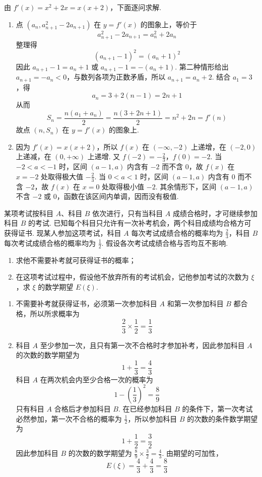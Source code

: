 \begin{solution}
由 \(f'(x)=x^2+2x=x(x+2)\)，下面逐问求解.
\begin{enumerate}
\item 点 \((a_n,a_{n+1}^2-2a_{n+1})\) 在 \(y=f'(x)\) 的图象上，等价于
\[
a_{n+1}^2-2a_{n+1}=a_n^2+2a_n
\]
整理得
\[
(a_{n+1}-1)^2=(a_n+1)^2
\]
因此 \(a_{n+1}-1=a_n+1\) 或 \(a_{n+1}-1=-(a_n+1)\). 第二种情形给出 \(a_{n+1}=-a_n<0\)，与数列各项为正数矛盾，所以 \(a_{n+1}=a_n+2\). 结合 \(a_1=3\)，得
\[
a_n=3+2(n-1)=2n+1
\]
从而
\[
S_n=\frac{n(a_1+a_n)}{2}=\frac{n(3+2n+1)}{2}=n^2+2n=f'(n)
\]
故点 \((n,S_n)\) 在 \(y=f'(x)\) 的图象上.

\item 因为 \(f'(x)=x(x+2)\)，所以 \(f(x)\) 在 \((-\infty,-2)\) 上递增，在 \((-2,0)\) 上递减，在 \((0,+\infty)\) 上递增. 又 \(f(-2)=-\frac{2}{3}\)，\(f(0)=-2\).
当 \(-2<a<-1\) 时，区间 \((a-1,a)\) 内含有 \(-2\) 而不含 \(0\)，故 \(f(x)\) 在 \(x=-2\) 处取得极大值 \(-\frac{2}{3}\). 当 \(0<a<1\) 时，区间 \((a-1,a)\) 内含有 \(0\) 而不含 \(-2\)，故 \(f(x)\) 在 \(x=0\) 处取得极小值 \(-2\). 其余情形下，区间 \((a-1,a)\) 不含 \(-2\) 或 \(0\)，函数在该区间内单调，因而没有极值.
\end{enumerate}
\end{solution}

\begin{problem}
某项考试按科目 \(A\)、科目 \(B\) 依次进行，只有当科目 \(A\) 成绩合格时，才可继续参加科目 \(B\) 的考试. 已知每个科目只允许有一次补考机会，两个科目成绩均合格方可获得证书. 现某人参加这项考试，科目 \(A\) 每次考试成绩合格的概率均为 \( \frac{2}{3} \)，科目 \(B\) 每次考试成绩合格的概率均为 \( \frac{1}{2} \). 假设各次考试成绩合格与否均互不影响.
\begin{enumerate}
\item 求他不需要补考就可获得证书的概率；
\item 在这项考试过程中，假设他不放弃所有的考试机会，记他参加考试的次数为 \(\xi\)，求 \(\xi\) 的数学期望 \(E(\xi)\).
\end{enumerate}
\end{problem}

\begin{solution}
\begin{enumerate}
\item 不需要补考就获得证书，必须第一次参加科目 \(A\) 和第一次参加科目 \(B\) 都合格，所以所求概率为
\[
\frac{2}{3}\times\frac{1}{2}=\frac{1}{3}
\]

\item 科目 \(A\) 至少参加一次，且只有第一次不合格时才参加补考，因此参加科目 \(A\) 的次数的数学期望为
\[
1+\frac{1}{3}=\frac{4}{3}
\]
科目 \(A\) 在两次机会内至少合格一次的概率为
\[
1-\left(\frac{1}{3}\right)^2=\frac{8}{9}
\]
只有科目 \(A\) 合格后才参加科目 \(B\). 在已经参加科目 \(B\) 的条件下，第一次考试必然参加，第一次不合格的概率为 \(\frac{1}{2}\)，所以参加科目 \(B\) 的次数的条件数学期望为
\[
1+\frac{1}{2}=\frac{3}{2}
\]
因此参加科目 \(B\) 的次数的数学期望为 \(\frac{8}{9}\times\frac{3}{2}=\frac{4}{3}\). 由期望的可加性，
\[
E(\xi)=\frac{4}{3}+\frac{4}{3}=\frac{8}{3}
\]
\end{enumerate}
\end{solution}

